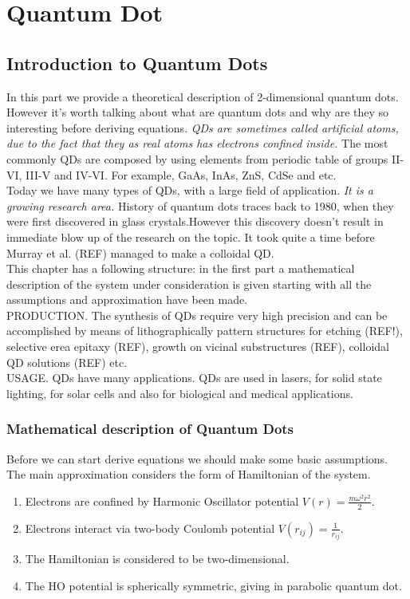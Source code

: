 \documentclass[twoside,english]{uiofysmaster}
\theoremstyle{definition}
\begin{document}
 
 


\chapter{Quantum Dot}

\section{Introduction to Quantum Dots}
In this part we provide a theoretical description of 2-dimensional quantum dots. However it's worth talking about what are quantum dots and why are they so interesting before deriving equations. \textit{QDs are sometimes called artificial atoms, due to the fact that they as real atoms has electrons confined inside.} The most commonly QDs are composed by using elements from periodic table of groups II-VI, III-V and IV-VI. For example, GaAs, InAs, ZnS, CdSe and etc.\\
Today we have many types of QDs, with a large field of application. \textit{It is a growing research area.} History of quantum dots traces back to 1980, when they were first discovered in glass crystals.However this discovery doesn't result in immediate blow up of the research on the topic. It took quite a time before Murray et al. (REF) managed to make a colloidal QD. \\
This chapter has a following structure: in the first part a mathematical description of the system under consideration is given starting with all the assumptions and approximation have been made.\\
PRODUCTION. The synthesis of QDs require very high precision and can be accomplished by means of lithographically pattern structures for etching (REF!), selective erea epitaxy (REF), growth on vicinal substructures (REF), colloidal QD solutions (REF) etc.\\  
USAGE. QDs have many applications. QDs are used in lasers, for solid state lighting, for solar cells and also for biological and medical applications. 

\subsection{Mathematical description of Quantum Dots}\label{sec:math_qd}
Before we can start derive equations we should make some basic assumptions. The main approximation considers the form of Hamiltonian of the system.\\
\begin{enumerate}
	\item Electrons are confined by  Harmonic Oscillator potential $V(r)=\frac{m\omega^2 r^2}{2}$.
	\item Electrons interact via two-body Coulomb potential  $V(r_{ij})=\frac{1}{r_{ij}}$.
	\item The Hamiltonian is considered to be two-dimensional.
	\item The HO potential is spherically symmetric, giving in parabolic quantum dot.
\end{enumerate}
\end{document}
